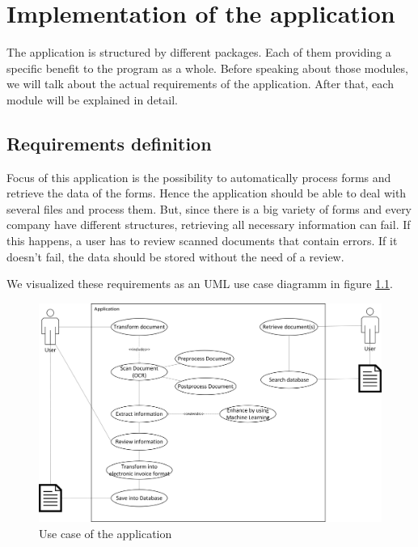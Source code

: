 %
% 
\chapter{Implementation of the application}
\label{cha5}

The application is structured by different packages. Each of them providing a specific benefit to the program as a whole. Before speaking about those modules, we will talk about the actual requirements of the application. After that, each module will be explained in detail. %

\section{Requirements definition}
\label{sec5.1}

Focus of this application is the possibility to automatically process forms and retrieve the data of the forms. Hence the application should be able to deal with several files and process them. But, since there is a big variety of forms and every company have different structures, retrieving all necessary information can fail. If this happens, a user has to review scanned documents that contain errors. If it doesn't fail, the data should be stored without the need of a review.

We visualized these requirements as an UML use case diagramm in figure \ref{totalApplicationCase}.

\begin{figure}[ht!]
\centering
\includegraphics[width=\textwidth]{Images/UseCase/TotalApplicationCase.jpg}
\caption{Use case of the application \label{totalApplicationCase}}
\end{figure}


